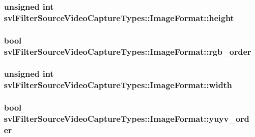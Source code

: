 \subsubsection[{height}]{\setlength{\rightskip}{0pt plus 5cm}unsigned int svl\+Filter\+Source\+Video\+Capture\+Types\+::\+Image\+Format\+::height}\label{classsvl_filter_source_video_capture_types_1_1_image_format_abb7d4da368b6bd7aea523163bece5d56}
\hypertarget{classsvl_filter_source_video_capture_types_1_1_image_format_a2fc3d0ae433e5def9e7f24d653ae8b47}{}
\subsubsection[{rgb\+\_\+order}]{\setlength{\rightskip}{0pt plus 5cm}bool svl\+Filter\+Source\+Video\+Capture\+Types\+::\+Image\+Format\+::rgb\+\_\+order}\label{classsvl_filter_source_video_capture_types_1_1_image_format_a2fc3d0ae433e5def9e7f24d653ae8b47}
\hypertarget{classsvl_filter_source_video_capture_types_1_1_image_format_a240891b8edeff025cfc146a8bf0f10c8}{}
\subsubsection[{width}]{\setlength{\rightskip}{0pt plus 5cm}unsigned int svl\+Filter\+Source\+Video\+Capture\+Types\+::\+Image\+Format\+::width}\label{classsvl_filter_source_video_capture_types_1_1_image_format_a240891b8edeff025cfc146a8bf0f10c8}
\hypertarget{classsvl_filter_source_video_capture_types_1_1_image_format_a7cbd79938ec75e77ea6cb6d8b0d414a0}{}
\subsubsection[{yuyv\+\_\+order}]{\setlength{\rightskip}{0pt plus 5cm}bool svl\+Filter\+Source\+Video\+Capture\+Types\+::\+Image\+Format\+::yuyv\+\_\+order}\label{classsvl_filter_source_video_capture_types_1_1_image_format_a7cbd79938ec75e77ea6cb6d8b0d414a0}


